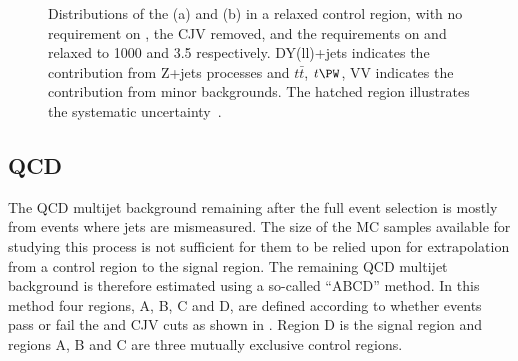\begin{figure}
  \caption{Distributions of the \METnoMU (a) and \Mjj (b) in a relaxed \PZ control region, with no requirement on \dphijj, the \ac{CJV} removed, and the requirements on \Mjj and \detajj relaxed to 1000 \GeV and 3.5 respectively. DY(ll)+jets indicates the contribution from Z+jets processes and $t\bar{t}$, $t\PW$, VV indicates the contribution from minor backgrounds. The hatched region illustrates the systematic uncertainty~\cite{Chatrchyan:2014tja}.}
  \label{fig:promptznunu}
\end{figure}




\subsection{QCD}
\label{sec:promptacQCD}
The \ac{QCD} multijet background remaining after the full event selection is mostly from events where jets are mismeasured. The size of the \ac{MC} samples available for studying this process is not sufficient for them to be relied upon for extrapolation from a control region to the signal region. The remaining \ac{QCD} multijet background is therefore estimated using a so-called ``ABCD'' method. In this method four regions, A, B, C and D, are defined according to whether events pass or fail the \METnoMU and \ac{CJV} cuts as shown in . Region D is the signal region and regions A, B and C are three mutually exclusive control regions.

